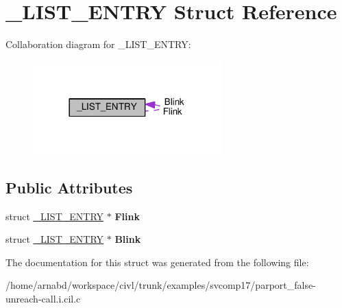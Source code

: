 \hypertarget{struct__LIST__ENTRY}{}\section{\+\_\+\+L\+I\+S\+T\+\_\+\+E\+N\+T\+R\+Y Struct Reference}
\label{struct__LIST__ENTRY}


Collaboration diagram for \+\_\+\+L\+I\+S\+T\+\_\+\+E\+N\+T\+R\+Y\+:
\nopagebreak
\begin{figure}[H]
\begin{center}
\leavevmode
\includegraphics[width=206pt]{struct__LIST__ENTRY__coll__graph}
\end{center}
\end{figure}
\subsection*{Public Attributes}
\begin{DoxyCompactItemize}
\item 
\hypertarget{struct__LIST__ENTRY_a4d67c5f973e82b7aa25c74f3a3ca4e30}{}struct \hyperlink{struct__LIST__ENTRY}{\+\_\+\+L\+I\+S\+T\+\_\+\+E\+N\+T\+R\+Y} $\ast$ {\bfseries Flink}\label{struct__LIST__ENTRY_a4d67c5f973e82b7aa25c74f3a3ca4e30}

\item 
\hypertarget{struct__LIST__ENTRY_a3a60644cad17d7dd53f6b7b378b191f3}{}struct \hyperlink{struct__LIST__ENTRY}{\+\_\+\+L\+I\+S\+T\+\_\+\+E\+N\+T\+R\+Y} $\ast$ {\bfseries Blink}\label{struct__LIST__ENTRY_a3a60644cad17d7dd53f6b7b378b191f3}

\end{DoxyCompactItemize}


The documentation for this struct was generated from the following file\+:\begin{DoxyCompactItemize}
\item 
/home/arnabd/workspace/civl/trunk/examples/svcomp17/parport\+\_\+false-\/unreach-\/call.\+i.\+cil.\+c\end{DoxyCompactItemize}
